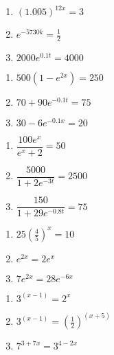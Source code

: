 \begin{multicols}{3}
\begin{enumerate}
\setcounter{enumi}{\value{HW}}

\item $(1.005)^{12x} = 3$
\item $e^{-5730k} = \frac{1}{2}$ 
\item $2000e^{0.1t} = 4000$  

\setcounter{HW}{\value{enumi}}
\end{enumerate}
\end{multicols}

\begin{multicols}{3}
\begin{enumerate}
\setcounter{enumi}{\value{HW}}


\item $500\left(1-e^{2x}\right) = 250$
\item $70 + 90e^{-0.1t} = 75$ 
\item $30-6e^{-0.1x}=20$ 


\setcounter{HW}{\value{enumi}}
\end{enumerate}
\end{multicols}

\begin{multicols}{3}
\begin{enumerate}
\setcounter{enumi}{\value{HW}}

\item $\dfrac{100e^{x}}{e^{x}+2}=50$ 
\item $\dfrac{5000}{1+2e^{-3t}}=2500$ 
\item $\dfrac{150}{1 + 29e^{-0.8t}} = 75$ 


\setcounter{HW}{\value{enumi}}
\end{enumerate}
\end{multicols}

\begin{multicols}{3}
\begin{enumerate}
\setcounter{enumi}{\value{HW}}

\item $25\left(\frac{4}{5}\right)^{x} = 10$  

\item $e^{2x} = 2e^{x}$ 
\item  $7e^{2x} = 28e^{-6x}$ 

\setcounter{HW}{\value{enumi}}
\end{enumerate}
\end{multicols}

\begin{multicols}{3}
\begin{enumerate}
\setcounter{enumi}{\value{HW}}

\item $3^{(x - 1)} = 2^{x}$ 
\item $3^{(x - 1)} = \left(\frac{1}{2}\right)^{(x + 5)}$ 
\item  $7^{3+7x} = 3^{4-2x}$  

\setcounter{HW}{\value{enumi}}
\end{enumerate}
\end{multicols}


